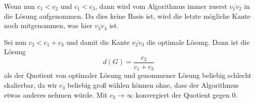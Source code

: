 \documentclass[11pt,a4paper,ngerman]{article}
\begin{document}
Wenn nun $c_1 < c_2$ und $c_1 < c_3$, dann wird vom Algorithmus immer zuerst $\overline{v_1v_2}$
in die Lösung aufgenommen. Da dies keine Basis ist, wird die letzte mögliche Kante noch mitgenommen,
was hier $\overline{v_3v_4}$ ist.

Sei nun $c_2 < c_1 + c_3$ und damit die Kante $\overline{v_2v_3}$ die optimale Lösung.
Dann ist die Lösung
\begin{equation}
    d(G) = \frac{c_2}{c_1 + c_3}
\end{equation}
als der Quotient von optimaler Lösung und genommener Lösung beliebig schlecht skalierbar,
da wir $c_3$ beliebig groß wählen können ohne, dass der Algorithmus etwas anderes nehmen würde.
Mit $c_3 \rightarrow \infty$ konvergiert der Quotient gegen $0$.

\label{LastPage}
\end{document}
